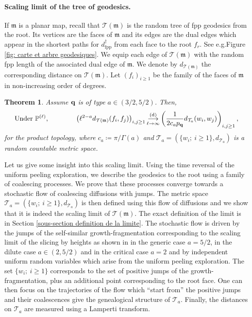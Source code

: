 \documentclass[11pt]{article}
\newtheorem{theorem}{Theorem}[section]
\numberwithin{equation}{section}
\def \T{\mathcal{T}}
\def\P{\mathbb{P}}
\begin{document}
\paragraph{Scaling limit of the tree of geodesics.} If $\mathfrak{m}$ is a planar map, recall that $\T(\mathfrak{m})$ is the random tree of fpp geodesics from the root. Its vertices are the faces of $\mathfrak{m}$ and its edges are the dual edges which appear in the shortest paths for $d^\dagger_\mathrm{fpp}$ from each face to the root $f_r$. See e.g.\@ Figure \ref{fig: carte et arbre geodesiques}. We equip each edge of $\T(\mathfrak{m})$ with the random fpp length of the associated dual edge of $\mathfrak{m}$. We denote by $d_{\T(\mathfrak{m})}$ the corresponding distance on $\T(\mathfrak{m})$. Let $(f_i)_{i\ge 1}$ be the family of the faces of $\mathfrak{m}$ in non-increasing order of degrees.
\begin{theorem}\label{Th limite d echelle de l arbre}
	Assume $\bf q$ is of type $a \in (3/2,5/2)$. Then,
	$$
	\text{Under }\P^{(\ell)}, \qquad \qquad
	\left( \ell^{2-a}d_{\T(\mathfrak{m})} 
	(f_i,f_j)
	\right)_{i,j\ge 1}
	\mathop{\longrightarrow}\limits_{\ell \to \infty}^{(\mathrm{d})}
	\left(\frac{1}{2c_a p_{\bf q}}d_{\T_a}(w_i,w_j)\right)_{i,j\ge 1},
	$$
	for the product topology, where $c_a\coloneqq \pi/\Gamma(a) $ and  $\T_a =(\{w_i; \ i \ge 1\},  d_{\T_a})$ is a random countable metric space.
\end{theorem}


Let us give some insight into this scaling limit. Using the time reversal of the uniform peeling exploration, we describe the geodesics to the root using a family of coalescing processes. We prove that these processes converge towards a stochastic flow of coalescing diffusions with jumps. The metric space $\T_a =(\{w_i; \ i \ge 1\},  d_{\T_a})$ is then defined using this flow of diffusions and we show that it is indeed the scaling limit of $\T(\mathfrak{m})$. The exact definition of the limit is in Section \ref{sous-section definition de la limite}. The stochastic flow is driven by the jumps of the self-similar growth-fragmentation corresponding to the scaling limit of the slicing by heights as shown in \cite{BCK} in the generic case $a=5/2$, \cite{BBCK} in the dilute case $a\in (2,5/2)$ and \cite{Kam23CLE} in the critical case $a =2$ and by independent uniform random variables which arise from the uniform peeling exploration. The set $\{w_i; \ i \ge 1\}$ corresponds to the set of positive jumps of the growth-fragmentation, plus an additional point corresponding to the root face. One can then focus on the trajectories of the flow which ``start from'' the positive jumps and their coalescences give the genealogical structure of $\T_a$. Finally, the distances on $\T_a$ are measured using a Lamperti transform.
\end{document}
